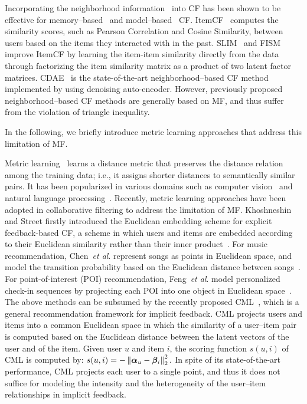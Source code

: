 \documentclass[conference]{IEEEtran}
\newcommand{\norm}[1]{\left\lVert#1\right\rVert}
\newcommand{\etal}{\textit{et al}. }
\begin{document}
Incorporating the neighborhood information~\cite{desrosiers2011comprehensive} into CF has been shown to be effective for memory--based~\cite{sarwar2001item} and model--based~\cite{ning2011slim,kabbur2013fism,wu2016collaborative,koren2008factorization} CF. 
ItemCF~\cite{sarwar2001item} computes the similarity scores, such as Pearson Correlation and Cosine Similarity, between users based on the items they interacted with in the past.
SLIM~\cite{ning2011slim} and FISM~\cite{kabbur2013fism} improve ItemCF by learning the item-item similarity directly from the data through factorizing the item similarity matrix as a product of two latent factor matrices. CDAE~\cite{wu2016collaborative} is the state-of-the-art neighborhood--based CF method implemented by using denoising auto-encoder. However, previously proposed neighborhood--based CF methods are generally based on MF, and thus suffer from the violation of triangle inequality.

In the following, we briefly introduce metric learning approaches that address this limitation of MF.


\smallskip
{}
Metric learning~\cite{yang2006distance} learns a distance metric that preserves the distance relation among the training data; i.e., it assigns shorter distances to semantically similar pairs. It has been popularized in various domains such as computer vision~\cite{bellet2013survey} and natural language processing~\cite{lebanon2006metric}. Recently, metric learning approaches have been adopted in collaborative filtering to address the limitation of MF.
Khoshneshin and Street firstly introduced the Euclidean embedding scheme for explicit feedback-based CF, a scheme in which users and items are embedded according to their Euclidean similarity rather than their inner product~\cite{khoshneshin2010collaborative}. For music recommendation, Chen~\etal represent songs as points in Euclidean space, and model the transition probability based on the Euclidean distance between songs~\cite{chen2012playlist}. For point-of-interest (POI) recommendation, Feng~\etal model personalized check-in sequences by projecting each POI into one object in Euclidean space~\cite{feng2015personalized}. 
The above methods can be subsumed by the recently proposed CML~\cite{hsieh2017collaborative}, which is a general recommendation framework for implicit feedback. CML projects users and items into a common Euclidean space in which the similarity of a user--item pair is computed based on the Euclidean distance between the latent vectors of the user and of the item. Given user $u$ and item $i$, the scoring function $s(u,i)$ of CML is computed by:
\begin{math}
\small
\label{eqn:CML_score}
s(u,i) = -\norm{\bm{\alpha}_u - {\bm{\beta}_i}}_2^2.
\end{math}
In spite of its state-of-the-art performance, CML projects each user to a single point, and thus it does not suffice for modeling the intensity and the heterogeneity of the user--item relationships in implicit feedback.
\end{document}
